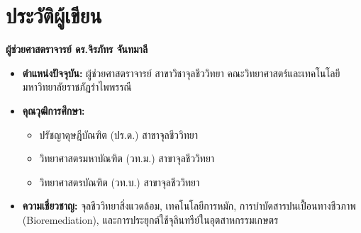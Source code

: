 \chapter{ประวัติผู้เขียน}

\begin{figure}[H]
\centering
{}
\end{figure}

\noindent\textbf{ผู้ช่วยศาสตราจารย์ ดร.จิรภัทร จันทมาลี}
\begin{itemize}
    \item \textbf{ตำแหน่งปัจจุบัน:} ผู้ช่วยศาสตราจารย์ สาขาวิชาจุลชีววิทยา คณะวิทยาศาสตร์และเทคโนโลยี มหาวิทยาลัยราชภัฏรำไพพรรณี
    \item \textbf{คุณวุฒิการศึกษา:} 
    \begin{itemize}
        \item ปรัชญาดุษฎีบัณฑิต (ปร.ด.) สาขาจุลชีววิทยา
        \item วิทยาศาสตรมหาบัณฑิต (วท.ม.) สาขาจุลชีววิทยา
        \item วิทยาศาสตรบัณฑิต (วท.บ.) สาขาจุลชีววิทยา
    \end{itemize}
    \item \textbf{ความเชี่ยวชาญ:} จุลชีววิทยาสิ่งแวดล้อม, เทคโนโลยีการหมัก, การบำบัดสารปนเปื้อนทางชีวภาพ (Bioremediation), และการประยุกต์ใช้จุลินทรีย์ในอุตสาหกรรมเกษตร
\end{itemize}

\vspace{1cm}

\begin{figure}[H]
\centering
{}
\end{figure}

